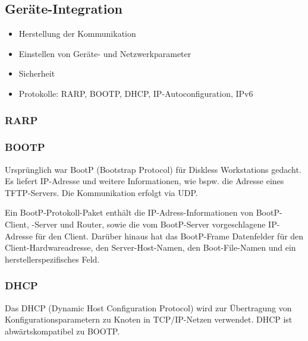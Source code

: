 \documentclass{article} %
\begin{document}
	
\subsection{Geräte-Integration}	
	\begin{itemize}
	\item Herstellung der Kommunikation 
	\item Einstellen von Geräte- und Netzwerkparameter 
	\item Sicherheit 
	\item Protokolle: RARP, BOOTP, DHCP, IP-Autoconfiguration, IPv6 
	\end{itemize}
\subsubsection{RARP}


\subsubsection{BOOTP}
Ursprünglich war BootP (Bootstrap Protocol) \cite{rfc951} für Diskless Workstations gedacht. Es liefert IP-Adresse und weitere Informationen, wie bspw. die Adresse eines TFTP-Servers. Die Kommunikation erfolgt via UDP.

Ein BootP-Protokoll-Paket enthält die IP-Adress-Informationen von BootP-Client, -Server und Router, sowie die vom BootP-Server vorgeschlagene IP-Adresse für den Client. Darüber hinaus hat das BootP-Frame Datenfelder für den Client-Hardwareadresse, den Server-Host-Namen, den Boot-File-Namen und ein herstellerspezifisches Feld.  


\subsubsection{DHCP}
	Das DHCP (Dynamic Host Configuration Protocol) \cite{rfc2131,rfc2132} wird zur  Übertragung von Konfigurationsparametern zu Knoten in TCP/IP-Netzen verwendet. DHCP ist abwärtskompatibel zu BOOTP.\\
	
\end{document}
